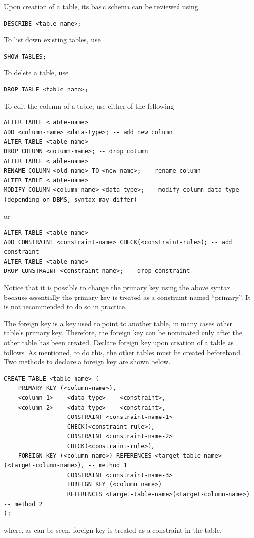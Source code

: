 Upon creation of a table, its basic schema can be reviewed using
\begin{lstlisting}
DESCRIBE <table-name>;
\end{lstlisting}
To list down existing tables, use
\begin{lstlisting}
SHOW TABLES;
\end{lstlisting}
To delete a table, use
\begin{lstlisting}
DROP TABLE <table-name>;
\end{lstlisting}

To edit the column of a table, use either of the following
\begin{lstlisting}
ALTER TABLE <table-name>
ADD <column-name> <data-type>; -- add new column
ALTER TABLE <table-name>
DROP COLUMN <column-name>; -- drop column
ALTER TABLE <table-name>
RENAME COLUMN <old-name> TO <new-name>; -- rename column
ALTER TABLE <table-name>
MODIFY COLUMN <column-name> <data-type>; -- modify column data type (depending on DBMS, syntax may differ)
\end{lstlisting}
or
\begin{lstlisting}
ALTER TABLE <table-name>
ADD CONSTRAINT <constraint-name> CHECK(<constraint-rule>); -- add constraint
ALTER TABLE <table-name>
DROP CONSTRAINT <constraint-name>; -- drop constraint
\end{lstlisting}
Notice that it is possible to change the primary key using the above syntax because essentially the primary key is treated as a constraint named ``primary''. It is not recommended to do so in practice.

The foreign key is a key used to point to another table, in many cases other table's primary key. Therefore, the foreign key can be nominated only after the other table has been created. Declare foreign key upon creation of a table as follows. As mentioned, to do this, the other tables must be created beforehand. Two methods to declare a foreign key are shown below.
\begin{lstlisting}
CREATE TABLE <table-name> (
    PRIMARY KEY (<column-name>),
    <column-1>    <data-type>    <constraint>,
    <column-2>    <data-type>    <constraint>,
                  CONSTRAINT <constraint-name-1>
                  CHECK(<constraint-rule>),
                  CONSTRAINT <constraint-name-2>
                  CHECK(<constraint-rule>),
    FOREIGN KEY (<column-name>) REFERENCES <target-table-name>(<target-column-name>), -- method 1
                  CONSTRAINT <constraint-name-3>
                  FOREIGN KEY (<column name>)
                  REFERENCES <target-table-name>(<target-column-name>) -- method 2
);
\end{lstlisting}
where, as can be seen, foreign key is treated as a constraint in the table.

